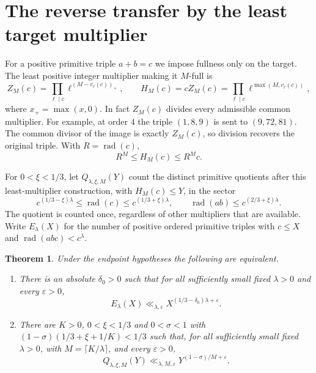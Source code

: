 \documentclass[11pt,reqno]{amsart}
\newtheorem{theorem}{Theorem}
\DeclareMathOperator{\rad}{rad}
\newcommand{\eps}{\varepsilon}
\begin{document}
\section{The reverse transfer by the least target multiplier}
\label{sec:reverse-transfer}

For a positive primitive triple \(a+b=c\) we impose fullness only
on the target. The least positive integer multiplier making it
\(M\)-full is
\[
  Z_M(c)=\prod_{\ell\mid c}\ell^{(M-v_\ell(c))_+},
  \qquad H_M(c)=c Z_M(c)
  =\prod_{\ell\mid c}\ell^{\max(M,v_\ell(c))},
\]
where \(x_+=\max(x,0)\). In fact \(Z_M(c)\) divides every
admissible common multiplier. For example, at order \(4\) the
triple \((1,8,9)\) is sent to \((9,72,81)\). The common
divisor of the image is exactly \(Z_M(c)\), so division recovers
the original triple. With \(R=\rad(c)\),
\begin{equation}\label{eq:repair-height}
   R^M\le H_M(c)\le R^M c .
\end{equation}

For \(0<\xi<1/3\), let \(Q_{\lambda,\xi,M}(Y)\) count the
distinct primitive quotients after this least-multiplier construction,
with \(H_M(c)\le Y\), in the sector
\begin{equation}\label{eq:repair-sector}
  c^{(1/3-\xi)\lambda}\le\rad(c)\le c^{(1/3+\xi)\lambda},
  \qquad \rad(ab)\le c^{(2/3+\xi)\lambda}.
\end{equation}
The quotient is counted once, regardless of other multipliers
that are available. Write \(E_\lambda(X)\) for the number of
positive ordered primitive triples with \(c\le X\) and
\(\rad(abc)<c^\lambda\).

\begin{theorem}\label{thm:reverse-transfer}
Under the endpoint hypotheses the following are equivalent.
\begin{enumerate}
\item There is an absolute \(\delta_0>0\) such that for all
sufficiently small fixed \(\lambda>0\) and every \(\eps>0\),
\[
 E_\lambda(X)\ll_{\lambda,\eps}
                   X^{(1/3-\delta_0)\lambda+\eps}.
\]
\item There are \(K>0\), \(0<\xi<1/3\) and \(0<\sigma<1\)
with \((1-\sigma)(1/3+\xi+1/K)<1/3\) such that, for all
sufficiently small fixed \(\lambda>0\), with
\(M=\lceil K/\lambda\rceil\), and every \(\eps>0\),
\[
 Q_{\lambda,\xi,M}(Y)\ll_{\lambda,M,\eps}
                   Y^{(1-\sigma)/M+\eps}.
\]
\end{enumerate}
\end{theorem}
\end{document}

